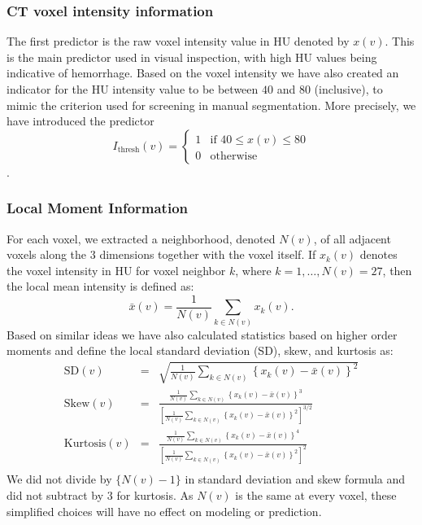 \documentclass{elsarticle_nonatbib}\usepackage[]{graphicx}\usepackage[]{color}
\begin{document}
\subsubsection{CT voxel intensity information} The first predictor is the raw voxel intensity value in HU denoted by $x(v)$. This is the main predictor used in visual inspection, with high HU values being indicative of hemorrhage. Based on the voxel intensity we have also created an indicator for the HU intensity value to be between $40$ and $80$ (inclusive), to mimic the criterion used for screening in manual segmentation. More precisely, we have introduced the predictor $$
I_{\text{thresh}}(v) = \begin{cases}
1 & \text{if } 40 \leq x(v) \leq 80 \\
0 & \text{otherwise}
\end{cases}
$$. 

\subsubsection{Local Moment Information} For each voxel, we extracted a neighborhood, denoted $N(v)$, of all adjacent voxels along the $3$ dimensions together with the voxel itself.  If $x_k(v)$ denotes the voxel intensity in HU for voxel neighbor $k$, where $k = 1, \dots, N(v) = 27$, then the local mean intensity is defined as:
\begin{equation}
\bar{x}(v) = \frac{1}{N(v)} \sum_{k \in N(v)} x_k(v). \label{eq:mean}
\end{equation}
Based on similar ideas we have also calculated statistics based on higher order moments and define the local standard deviation (SD), skew, and kurtosis as:
\begin{eqnarray*}
\text{SD}(v) &=& \sqrt{ \frac{1}{N(v)} \sum_{k \in N(v)} \left\{x_k(v) - \bar{x}(v)\right\}^2 } \\
\text{Skew}(v) &=& \frac{ \frac{1}{N(v)} \sum\limits_{k \in N(v)} \left\{x_k(v)-\bar{x}(v) \right\}^3 } {\left[ \frac{1}{N(v)} \sum\limits_{k \in N(v)} \left\{x_k(v)- \bar{x}(v)\right\}^2\right]^{3/2}} \\
\text{Kurtosis}(v) &=& \frac{ \frac{1}{N(v)} \sum\limits_{k \in N(v)} \left\{x_k(v)- \bar{x}(v)\right\}^4 }{ \left[ \frac{1}{N(v)} \sum\limits_{k \in N(v)} \left\{x_k(v)- \bar{x}(v)\right\}^2\right]^2} \\
\label{eq:moment}
\end{eqnarray*}
We did not divide by $\{N(v) - 1\}$ in standard deviation and skew formula and did not subtract by $3$ for kurtosis.  As $N(v)$ is the same at every voxel, these simplified choices will have no effect on modeling or prediction. 
\end{document}
